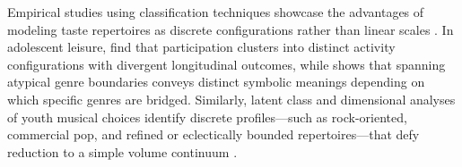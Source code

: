 \documentclass[12pt]{article}
\begin{document}
Empirical studies using classification techniques showcase the advantages of modeling taste repertoires as discrete configurations rather than linear scales \citep{thornton2024patterns,cicchelli2017aesthetico,spacek2017measuring}. In adolescent leisure, \citet{thornton2024patterns} find that participation clusters into distinct activity configurations with divergent longitudinal outcomes, while \citet{goldberg2016what-4e3} shows that spanning atypical genre boundaries conveys distinct symbolic meanings depending on which specific genres are bridged. Similarly, latent class and dimensional analyses of youth musical choices identify discrete profiles---such as rock-oriented, commercial pop, and refined or eclectically bounded repertoires---that defy reduction to a simple volume continuum \citep{carbone2024adolescents,delsing2008adolescents}.



\end{document}
